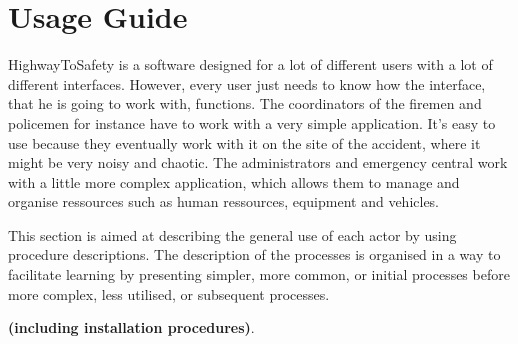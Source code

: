 \chapter{Usage Guide}
\label{chap:usage_guide}
HighwayToSafety is a software designed for a lot of different users with a lot
of different interfaces. However, every user just needs to know how the
interface, that he is going to work with, functions. The coordinators of the
firemen and policemen for instance have to work with a very simple application.
It's easy to use because they eventually work with it on the site of the
accident, where it might be very noisy and chaotic.
The administrators and emergency central work with a little more complex
application, which allows them to manage and organise ressources such as human
ressources, equipment and vehicles.

This section is aimed at describing the general use of each actor by using
procedure descriptions. The description of the processes is organised in a way
to facilitate learning by presenting simpler, more common, or initial processes 
before more complex, less utilised, or subsequent processes.

\textbf{(including installation procedures)}.


